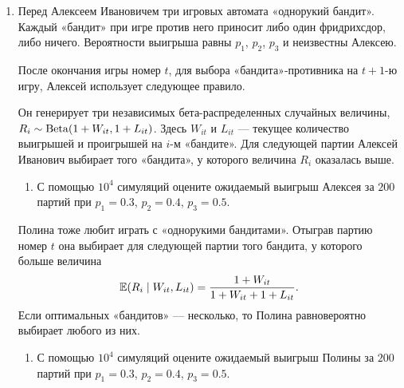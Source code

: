 \begin{enumerate}
\item Перед Алексеем Ивановичем три игровых автомата «однорукий бандит». 
Каждый «бандит» при игре против него приносит либо один фридрихсдор, либо ничего. 
Вероятности выигрыша равны $p_1$, $p_2$, $p_3$ и неизвестны Алексею.

После окончания игры номер $t$, для выбора «бандита»-противника на $t+1$-ю игру,
Алексей использует следующее правило.

Он генерирует три независимых бета-распределенных случайных величины, $R_i \sim \mathrm{Beta}(1 + W_{it}, 1 + L_{it})$.
Здесь $W_{it}$ и $L_{it}$ — текущее количество выигрышей и проигрышей на $i$-м «бандите».
Для следующей партии Алексей Иванович выбирает того «бандита», у которого величина $R_i$ оказалась выше. 

\begin{enumerate}
    \item С помощью $10^4$ симуляций оцените ожидаемый выигрыш Алексея за $200$ партий при $p_1 = 0.3$, $p_2 = 0.4$, $p_3 = 0.5$.
\end{enumerate}

Полина тоже любит играть с «однорукими бандитами». 
Отыграв партию номер $t$ она выбирает для следующей партии того бандита, у которого больше величина
\[ 
\operatorname{\mathbb{E}}(R_i \mid W_{it}, L_{it}) = \frac{1 + W_{it}}{1 + W_{it} + 1 + L_{it}}.
\]
Если оптимальных «бандитов» — несколько, то Полина равновероятно выбирает любого из них.

\begin{enumerate}[resume]
    \item С помощью $10^4$ симуляций оцените ожидаемый выигрыш Полины за $200$ партий при $p_1 = 0.3$, $p_2 = 0.4$, $p_3 = 0.5$.
\end{enumerate}


\end{enumerate}

